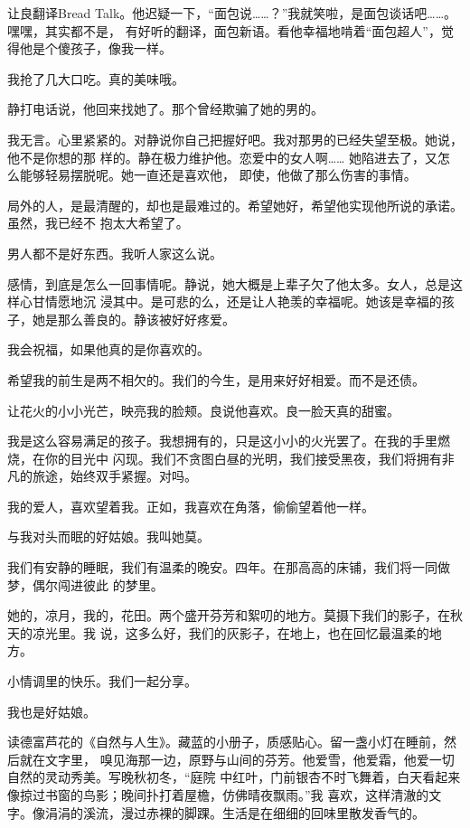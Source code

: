 		让良翻译Bread Talk。他迟疑一下，“面包说……？”我就笑啦，是面包谈话吧……。嘿嘿，其实都不是，
	有好听的翻译，面包新语。看他幸福地啃着“面包超人”，觉得他是个傻孩子，像我一样。

		我抢了几大口吃。真的美味哦。


		静打电话说，他回来找她了。那个曾经欺骗了她的男的。

		我无言。心里紧紧的。对静说你自己把握好吧。我对那男的已经失望至极。她说，他不是你想的那
	样的。静在极力维护他。恋爱中的女人啊…… 她陷进去了，又怎么能够轻易摆脱呢。她一直还是喜欢他，
	即使，他做了那么伤害的事情。

		局外的人，是最清醒的，却也是最难过的。希望她好，希望他实现他所说的承诺。虽然，我已经不
	抱太大希望了。

		男人都不是好东西。我听人家这么说。

		感情，到底是怎么一回事情呢。静说，她大概是上辈子欠了他太多。女人，总是这样心甘情愿地沉
	浸其中。是可悲的么，还是让人艳羡的幸福呢。她该是幸福的孩子，她是那么善良的。静该被好好疼爱。

		我会祝福，如果他真的是你喜欢的。

		希望我的前生是两不相欠的。我们的今生，是用来好好相爱。而不是还债。


		让花火的小小光芒，映亮我的脸颊。良说他喜欢。良一脸天真的甜蜜。

		我是这么容易满足的孩子。我想拥有的，只是这小小的火光罢了。在我的手里燃烧，在你的目光中
	闪现。我们不贪图白昼的光明，我们接受黑夜，我们将拥有非凡的旅途，始终双手紧握。对吗。

		我的爱人，喜欢望着我。正如，我喜欢在角落，偷偷望着他一样。


		与我对头而眠的好姑娘。我叫她莫。

		我们有安静的睡眠，我们有温柔的晚安。四年。在那高高的床铺，我们将一同做梦，偶尔闯进彼此
	的梦里。

		她的，凉月，我的，花田。两个盛开芬芳和絮叨的地方。莫摄下我们的影子，在秋天的凉光里。我
	说，这多么好，我们的灰影子，在地上，也在回忆最温柔的地方。

		小情调里的快乐。我们一起分享。

		我也是好姑娘。


		读德富芦花的《自然与人生》。藏蓝的小册子，质感贴心。留一盏小灯在睡前，然后就在文字里，
	嗅见海那一边，原野与山间的芬芳。他爱雪，他爱霜，他爱一切自然的灵动秀美。写晚秋初冬，“庭院
	中红叶，门前银杏不时飞舞着，白天看起来像掠过书窗的鸟影；晚间扑打着屋檐，仿佛晴夜飘雨。”我
	喜欢，这样清澈的文字。像涓涓的溪流，漫过赤裸的脚踝。生活是在细细的回味里散发香气的。

